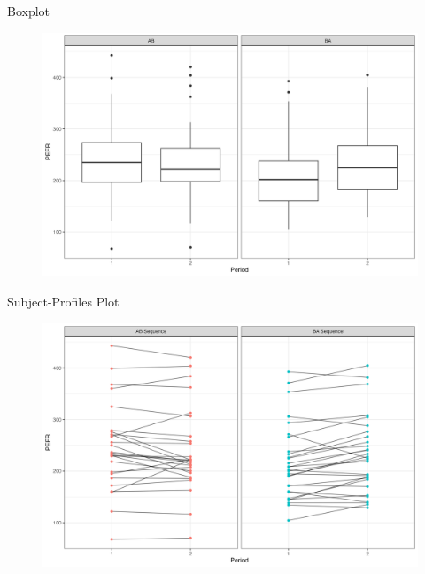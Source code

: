 \documentclass{beamer}
\begin{document}
\begin{frame}{Boxplot}
    \begin{figure}
    \centering
    \includegraphics[width=\linewidth]{report/figures/ch2/boxplot.png}
\end{figure}
\end{frame}

\begin{frame}{Subject-Profiles Plot}
    \begin{figure}
        \centering
        \includegraphics[width=\linewidth]{report/figures/ch2/subjectProfilesPlot.png}
    \end{figure}
\end{frame}
\end{document}
